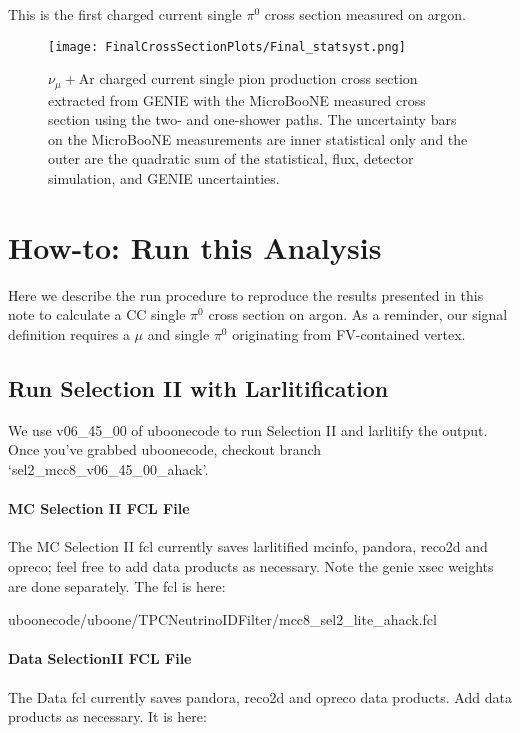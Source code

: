 \documentclass{article}
\begin{document}
This is the first charged current single $\pi^0$ cross section measured on argon.

\begin{figure}[h!]
\centering
\texttt{[image: FinalCrossSectionPlots/Final\_statsyst.png]}
\caption{ $\nu_{\mu}+\text{Ar}$ charged current single pion production cross section extracted from GENIE with the MicroBooNE measured cross section using the two- and one-shower paths. The uncertainty bars on the MicroBooNE measurements are inner statistical only and the outer are the quadratic sum of the statistical, flux, detector simulation, and GENIE uncertainties.}
\label{fig:genie_uboone_xsec2}
\end{figure}


\clearpage
\appendix
\clearpage
\section{How-to: Run this Analysis}
\label{sec:AppA}
Here we describe the run procedure to reproduce the results presented in this note to calculate a CC single $\pi^0$ cross section on argon. As a reminder, our signal definition requires a $\mu$ and single $\pi^0$ originating from FV-contained vertex.

\subsection{Run Selection II with Larlitification}
We use v06\_45\_00 of uboonecode to run Selection II and larlitify the output. Once you've grabbed uboonecode, checkout branch `sel2\_mcc8\_v06\_45\_00\_ahack'.

\paragraph{MC Selection II FCL File}
\noindent The MC Selection II fcl currently saves larlitified mcinfo, pandora, reco2d and opreco; feel free to add data products as necessary. Note the genie xsec weights are done separately. The fcl is here:

\par uboonecode/uboone/TPCNeutrinoIDFilter/mcc8\_sel2\_lite\_ahack.fcl

\paragraph{Data SelectionII FCL File}
The Data fcl currently saves pandora, reco2d and opreco data products. Add data products as necessary.  It is here:
\end{document}
